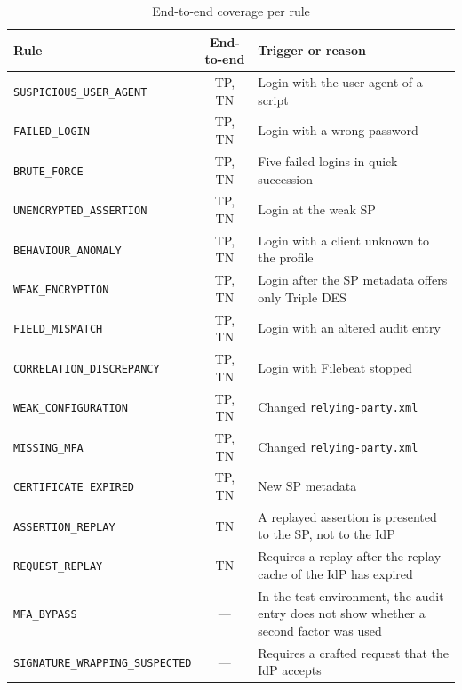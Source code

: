 \documentclass[../main.tex]{subfiles}
\begin{document}
\begin{table}[h]
\centering
\caption{End-to-end coverage per rule}\label{tab:detection-coverage}
\small
\begin{tabularx}{\textwidth}{@{}lc>{\raggedright\arraybackslash}X@{}}
\toprule
Rule & End-to-end & Trigger or reason \\
\midrule
\texttt{SUSPICIOUS\_USER\_AGENT}        & TP, TN & Login with the user agent of a script \\
\texttt{FAILED\_LOGIN}                  & TP, TN & Login with a wrong password \\
\texttt{BRUTE\_FORCE}                   & TP, TN & Five failed logins in quick succession \\
\texttt{UNENCRYPTED\_ASSERTION}         & TP, TN & Login at the weak SP \\
\texttt{BEHAVIOUR\_ANOMALY}             & TP, TN & Login with a client unknown to the profile \\
\texttt{WEAK\_ENCRYPTION}               & TP, TN & Login after the SP metadata offers only Triple DES \\
\texttt{FIELD\_MISMATCH}                & TP, TN & Login with an altered audit entry \\
\texttt{CORRELATION\_DISCREPANCY}       & TP, TN & Login with Filebeat stopped \\
\midrule
\texttt{WEAK\_CONFIGURATION}            & TP, TN & Changed \texttt{relying-party.xml} \\
\texttt{MISSING\_MFA}                   & TP, TN & Changed \texttt{relying-party.xml} \\
\texttt{CERTIFICATE\_EXPIRED}           & TP, TN & New SP metadata \\
\midrule
\texttt{ASSERTION\_REPLAY}              & TN     & A replayed assertion is presented to the SP, not to the IdP \\
\texttt{REQUEST\_REPLAY}                & TN     & Requires a replay after the replay cache of the IdP has expired \\
\midrule
\texttt{MFA\_BYPASS}                    & ---    & In the test environment, the audit entry does not show whether a second factor was used \\
\texttt{SIGNATURE\_WRAPPING\_SUSPECTED} & ---    & Requires a crafted request that the IdP accepts \\
\bottomrule
\end{tabularx}
\end{table}
\end{document}
